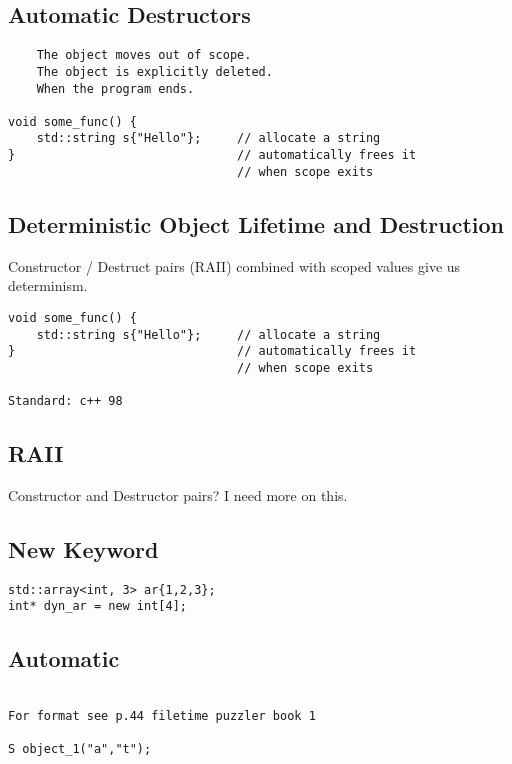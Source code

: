 \documentclass[openany]{report}
\begin{document}
\subsection{Automatic Destructors}

\begin{verbatim}
    The object moves out of scope.
    The object is explicitly deleted.
    When the program ends.

void some_func() {
    std::string s{"Hello"};     // allocate a string
}                               // automatically frees it
                                // when scope exits
\end{verbatim}

\subsection{Deterministic Object Lifetime and Destruction}

Constructor / Destruct pairs (RAII) combined with scoped values give us determinism.

\begin{verbatim}
void some_func() {
    std::string s{"Hello"};     // allocate a string
}                               // automatically frees it
                                // when scope exits

Standard: c++ 98
\end{verbatim}


\subsection{RAII}

Constructor and Destructor pairs? I need more on this.

\subsection{New Keyword}

\begin{verbatim}
std::array<int, 3> ar{1,2,3};
int* dyn_ar = new int[4];
\end{verbatim}



\subsection{Automatic}
\begin{verbatim}

For format see p.44 filetime puzzler book 1

S object_1("a","t");
\end{verbatim}
\end{document}
